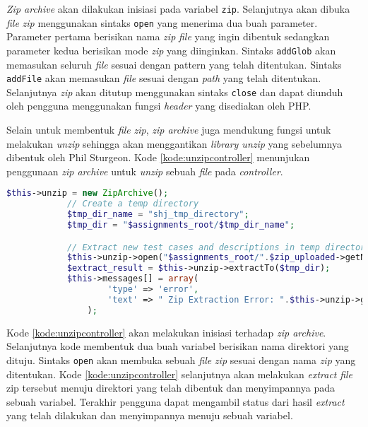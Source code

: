 \textit{Zip archive} akan dilakukan inisiasi pada variabel \texttt{zip}. Selanjutnya akan dibuka \textit{file} \textit{zip} menggunakan sintaks \texttt{open} yang menerima dua buah parameter. Parameter pertama berisikan nama \textit{zip} \textit{file} yang ingin dibentuk sedangkan parameter kedua berisikan mode \textit{zip} yang diinginkan. Sintaks \texttt{addGlob} akan memasukan seluruh \textit{file} sesuai dengan pattern yang telah ditentukan. Sintaks \texttt{addFile} akan memasukan \textit{file} sesuai dengan \textit{path} yang telah ditentukan. Selanjutnya \textit{zip} akan ditutup menggunakan sintaks \texttt{close} dan dapat diunduh oleh pengguna menggunakan fungsi \textit{header} yang disediakan oleh PHP.


Selain untuk membentuk \textit{file} \textit{zip}, \textit{zip archive} juga mendukung fungsi untuk melakukan \textit{unzip} sehingga akan menggantikan \textit{library unzip} yang sebelumnya dibentuk oleh Phil Sturgeon. Kode \ref{kode:unzipcontroller} menunjukan penggunaan \textit{zip archive} untuk \textit{unzip} sebuah \textit{file} pada \textit{controller}.

\begin{lstlisting}[language=PHP, caption=Perancangan perubahan \textit{unzip} menggunakan \textit{zip archive} pada \textit{controller}, label=kode:unzipcontroller]
$this->unzip = new ZipArchive();
			// Create a temp directory
			$tmp_dir_name = "shj_tmp_directory";
			$tmp_dir = "$assignments_root/$tmp_dir_name";

			// Extract new test cases and descriptions in temp directory
			$this->unzip->open("$assignments_root/".$zip_uploaded->getName());
			$extract_result = $this->unzip->extractTo($tmp_dir);
			$this->messages[] = array(
					'type' => 'error',
					'text' => " Zip Extraction Error: ".$this->unzip->getStatusString(),
				);
\end{lstlisting}

Kode \ref{kode:unzipcontroller} akan melakukan inisiasi terhadap \textit{zip archive}. Selanjutnya kode membentuk dua buah variabel berisikan nama direktori yang dituju. Sintaks \texttt{open} akan membuka sebuah \textit{file} \textit{zip} sesuai dengan nama \textit{zip} yang ditentukan. Kode \ref{kode:unzipcontroller} selanjutnya akan melakukan \textit{extract} \textit{file} zip tersebut menuju direktori yang telah dibentuk dan menyimpannya pada sebuah variabel. Terakhir pengguna dapat mengambil status dari hasil \textit{extract} yang telah dilakukan dan menyimpannya menuju sebuah variabel.

